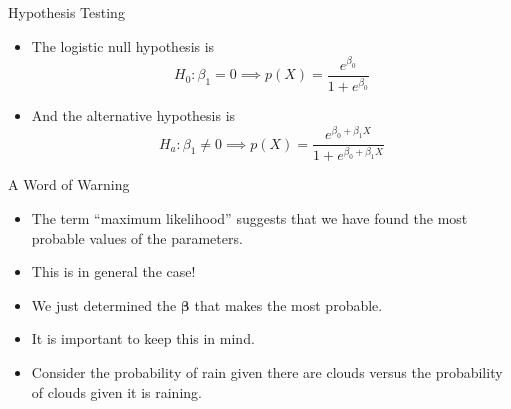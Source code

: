 \documentclass[mathserif, aspectratio=169]{beamer}
\begin{document}
\begin{frame}{Hypothesis Testing}
	\begin{itemize}
		\item The logistic null hypothesis is
			\[ H_0 : \beta_1 = 0 \implies p(X) = \frac{e^{\beta_0}}{1 + e^{\beta_0}} \]
		\item And the alternative hypothesis is
			\[ H_a : \beta_1 \neq 0 \implies p(X) = \frac{e^{\beta_0 + \beta_1 X}}
			{1 + e^{\beta_0 + \beta_1 X}} \]
	\end{itemize}
\end{frame}

\begin{frame}{A Word of Warning}
	\begin{itemize}
		\item The term ``maximum likelihood'' suggests that we have found the most probable values of 
			the parameters.
		\item This is in general  the case!
		\item We just determined the $\bm{\beta}$ that makes the  most probable.
		\item It is important to keep this in mind.
		\item Consider the probability of rain given there are clouds versus the probability of clouds
			given it is raining.
	\end{itemize}
\end{frame}
\end{document}
